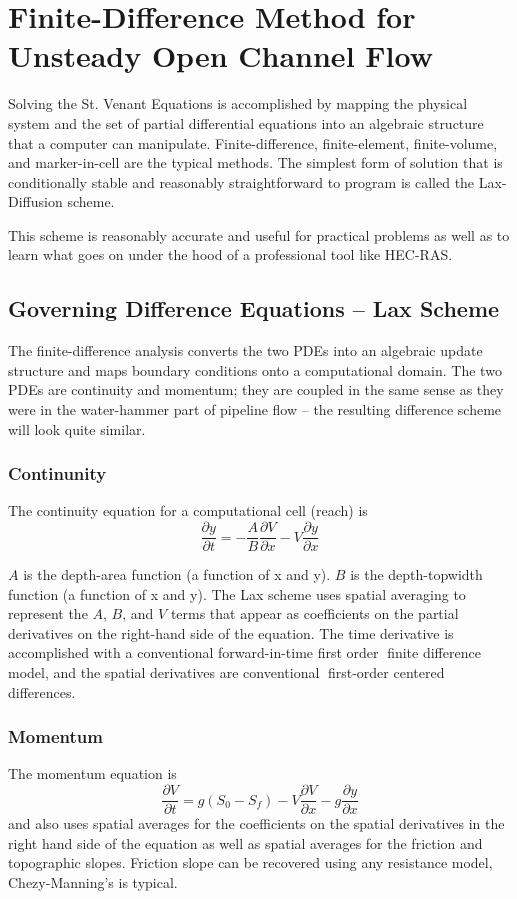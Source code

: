 \section{Finite-Difference Method for Unsteady Open Channel Flow}
Solving the St. Venant Equations is accomplished by mapping the physical system and the
set of partial differential equations into an algebraic structure that a computer can manipulate.
Finite-difference, finite-element, finite-volume, and marker-in-cell are the typical methods.
The simplest form of solution that is conditionally stable and reasonably straightforward to
program is called the Lax-Diffusion scheme.

This scheme is reasonably accurate and useful for practical problems as well as to learn what
goes on under the hood of a professional tool like HEC-RAS.
\subsection{Governing Difference Equations -- Lax Scheme}
The finite-difference analysis converts the two PDEs into an algebraic update structure and
maps boundary conditions onto a computational domain.
The two PDEs are continuity and momentum; they are coupled in the same sense as they were in the water-hammer part of pipeline flow -- the resulting difference scheme will look quite similar.
\subsubsection{Continunity}
The continuity equation for a computational cell (reach) is 
\begin{equation}
\frac{\partial y}{\partial t} = -\frac{A}{B}\frac{\partial V}{\partial x}-V\frac{\partial y}{\partial x}
\end{equation}

$A$ is the depth-area function (a function of x and y). 
$B$ is the depth-topwidth function (a function of x and y). 
The Lax scheme uses spatial averaging to represent the $A$, $B$, and $V$ terms that appear as coefficients on the partial derivatives on the right-hand side of the equation. 
The time derivative is accomplished with a conventional forward-in-time first order finite difference model, and the spatial derivatives are conventional first-order centered differences.

\subsubsection{Momentum}
The momentum equation is
\begin{equation}
\frac{\partial V}{\partial t} = g(S_0-S_f)-V\frac{\partial V}{\partial x}-g\frac{\partial y}{\partial x}
\end{equation}
and also uses spatial averages for the coefficients on the spatial derivatives in the right hand side of the equation as well as spatial averages for the friction and topographic slopes. 
Friction slope can be recovered using any resistance model, Chezy-Manning's is typical.

